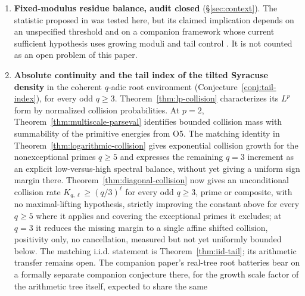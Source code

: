 \documentclass[11pt]{article}
\theoremstyle{definition}
\theoremstyle{remark}
\begin{document}
\begin{enumerate}[label=(O\arabic*)]
  inherited holes still allow zero primitive spectrum.
  Proposition~\ref{thm:propC} shows that the
  annealed $\ell^1$ budget tested here has insufficient strength. The
  entire wider family of annealed $\ell^r$ budgets, $r\ge1$, has since
  been tested and none closes the gap: the closing criterion is the
  same for every $r$ and only gets harder as $r$ grows, so $r=1$ was
  already the best member of the family, and the deficit's true
  inversion point is $\gamma\approx3.31$, above the naive threshold
  $\gamma=3$ used as a first pass earlier, since the identity behind
  Theorem~\ref{thm:jensen} requires $p\ge\tfrac12$ and degrades
  strictly below it.
\item \textbf{Fixed-modulus residue balance, audit closed}
  (\S\ref{sec:context}). The statistic proposed in \cite{Chang2026}
  was tested here, but its claimed implication depends on an unspecified
  threshold and on a companion framework whose current sufficient
  hypothesis uses growing moduli and tail control
  \cite{ChangCompanion2026}. It is not counted as an open problem of
  this paper.
\item \textbf{Absolute continuity and the tail index of the tilted
  Syracuse density} in the coherent $q$-adic root environment
  (Conjecture~\ref{conj:tail-index}), for every odd $q\ge3$.
  Theorem~\ref{thm:lp-collision} characterizes its $L^p$ form by
  normalized collision probabilities. At $p=2$,
  Theorem~\ref{thm:multiscale-parseval} identifies bounded collision
  mass with summability of the primitive energies from O5. The matching
  identity in Theorem~\ref{thm:logarithmic-collision} gives exponential
  collision growth for the nonexceptional primes $q\ge5$ and expresses
  the remaining $q=3$ increment as an explicit low-versus-high spectral
  balance, without yet giving a uniform sign margin there.
  Theorem~\ref{thm:diagonal-collision} now gives an unconditional
  collision rate $K_{q,\ell}\ge(q/3)^\ell$ for every odd $q\ge3$, prime
  or composite, with no maximal-lifting hypothesis, strictly improving
  the constant above for every $q\ge5$ where it applies and covering
  the exceptional primes it excludes; at $q=3$ it reduces the missing
  margin to a single affine shifted collision, positivity only, no
  cancellation, measured but not yet uniformly bounded below. The
  matching i.i.d. statement is
  Theorem~\ref{thm:iid-tail}; its arithmetic transfer remains open.
  The companion paper's real-tree root batteries bear on a
  formally separate companion conjecture there, for the growth scale
  factor of the arithmetic tree itself, expected to share the same

\end{enumerate}
\end{document}
